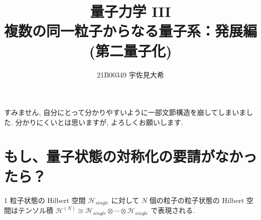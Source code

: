 \documentclass[uplatex,dvipdfmx,a4paper,11pt]{jlreq}
\title{量子力学 III \\ 複数の同一粒子からなる量子系：発展編 (第二量子化)}
\author{21B00349 宇佐見大希}
\newcommand{\HH}{\mathcal{H}}
\numberwithin{equation}{section}
\theoremstyle{definition}
\begin{document}
\maketitle
\tableofcontents
\clearpage

すみません, 自分にとって分かりやすいように一部文節構造を崩してしまいました. 分かりにくいとは思いますが, よろしくお願いします.

\section{もし、量子状態の対称化の要請がなかったら？}
\begin{definition}
  1 粒子状態の Hilbert 空間 $\HH_{single}$ に対して $N$ 個の粒子の粒子状態の Hilbert 空間はテンソル積 $\HH^{(N)}\cong\HH_{single}\otimes\cdots\otimes\HH_{single}$ で表現される.
\end{definition}
\end{document}
